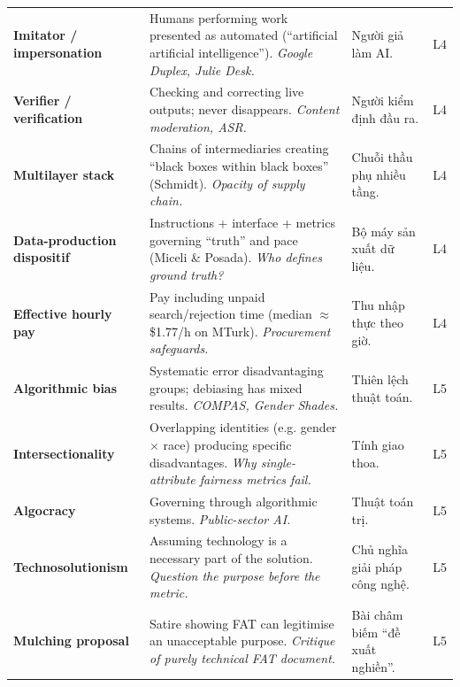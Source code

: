 \documentclass[11pt,a4paper]{article}
\begin{document}
{\begin{longtable}{>{\RaggedRight\arraybackslash\bfseries}p{3.3cm}>{\RaggedRight\arraybackslash}p{5.1cm}>{\RaggedRight\arraybackslash}p{5.1cm}>{\centering\arraybackslash}p{0.8cm}}
Imitator / impersonation & Humans performing work presented as automated (“artificial artificial intelligence”). \newline\textit{\color{teal}Google Duplex, Julie Desk.} & \textcolor{tipc}{Người giả làm AI.} & L4\\[3pt]
Verifier / verification & Checking and correcting live outputs; never disappears. \newline\textit{\color{teal}Content moderation, ASR.} & \textcolor{tipc}{Người kiểm định đầu ra.} & L4\\[3pt]
Multilayer stack & Chains of intermediaries creating “black boxes within black boxes” (Schmidt). \newline\textit{\color{teal}Opacity of supply chain.} & \textcolor{tipc}{Chuỗi thầu phụ nhiều tầng.} & L4\\[3pt]
Data-production dispositif & Instructions + interface + metrics governing “truth” and pace (Miceli \& Posada). \newline\textit{\color{teal}Who defines ground truth?} & \textcolor{tipc}{Bộ máy sản xuất dữ liệu.} & L4\\[3pt]
Effective hourly pay & Pay including unpaid search/rejection time (median $\approx$ \$1.77/h on MTurk). \newline\textit{\color{teal}Procurement safeguards.} & \textcolor{tipc}{Thu nhập thực theo giờ.} & L4\\[3pt]
Algorithmic bias & Systematic error disadvantaging groups; debiasing has mixed results. \newline\textit{\color{teal}COMPAS, Gender Shades.} & \textcolor{tipc}{Thiên lệch thuật toán.} & L5\\[3pt]
Intersectionality & Overlapping identities (e.g. gender $\times$ race) producing specific disadvantages. \newline\textit{\color{teal}Why single-attribute fairness metrics fail.} & \textcolor{tipc}{Tính giao thoa.} & L5\\[3pt]
Algocracy & Governing through algorithmic systems. \newline\textit{\color{teal}Public-sector AI.} & \textcolor{tipc}{Thuật toán trị.} & L5\\[3pt]
Technosolutionism & Assuming technology is a necessary part of the solution. \newline\textit{\color{teal}Question the purpose before the metric.} & \textcolor{tipc}{Chủ nghĩa giải pháp công nghệ.} & L5\\[3pt]
Mulching proposal & Satire showing FAT can legitimise an unacceptable purpose. \newline\textit{\color{teal}Critique of purely technical FAT document.} & \textcolor{tipc}{Bài châm biếm “đề xuất nghiền”.} & L5\\[3pt]

\end{longtable}}
\end{document}
